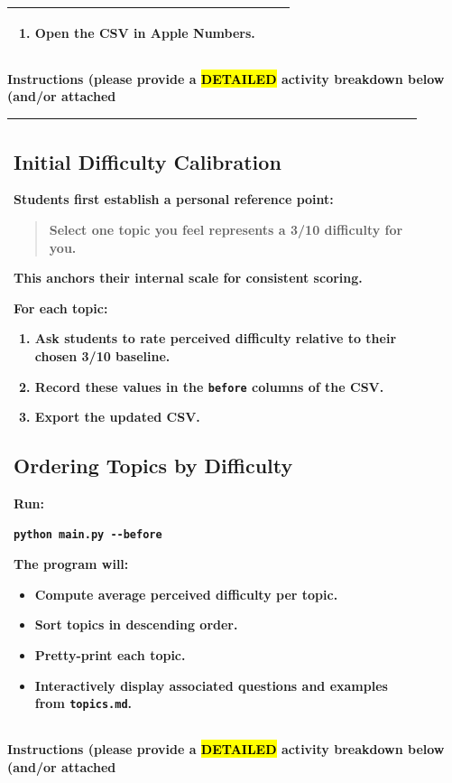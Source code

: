 \documentclass{article}
\begin{document}
\begin{flushleft}
\begin{tabular}{|p{0.9\linewidth}|}
\begin{enumerate}
\item Open the CSV in Apple Numbers.
\end{enumerate} \\
\hline
\end{tabular}
\newpage
\noindent
{\large \textbf{Instructions (please provide a \hl{DETAILED} activity breakdown below (and/or attached}} \\
\begin{tabular}{|p{0.9\linewidth}|}
\hline
\subsection{Initial Difficulty Calibration}

Students first establish a personal reference point:

\begin{quote}
Select one topic you feel represents a \textbf{3/10} difficulty for you.
\end{quote}

This anchors their internal scale for consistent scoring.

For each topic:

\begin{enumerate}
\item Ask students to rate perceived difficulty relative to their chosen 3/10 baseline.
\item Record these values in the \texttt{before} columns of the CSV.
\item Export the updated CSV.
\end{enumerate}

\subsection{Ordering Topics by Difficulty}

Run:

\begin{verbatim}
python main.py --before
\end{verbatim}

The program will:

\begin{itemize}
\item Compute average perceived difficulty per topic.
\item Sort topics in descending order.
\item Pretty-print each topic.
\item Interactively display associated questions and examples from \texttt{topics.md}.
\end{itemize} \\
\hline
\end{tabular}
\newpage
{\large \textbf{Instructions (please provide a \hl{DETAILED} activity breakdown below (and/or attached}} \\
\begin{tabular}{|p{0.9\linewidth}|}
\hline

\end{tabular}
\end{flushleft}
\end{document}
